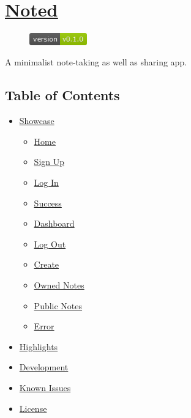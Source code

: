 \documentclass[
]{article}
\author{}
\date{}
\providecommand{\tightlist}{%
  \setlength{\itemsep}{0pt}\setlength{\parskip}{0pt}}
\begin{document}
\section{\centering \LARGE{\underline{\href{https://github.com/korigamik/noted}{Noted}}}}

\begin{figure}
  \centering
  \includegraphics[width=2.5cm]{./version-v0.1.0-green.png}
\end{figure}

A minimalist note-taking as well as sharing app.

\hypertarget{table-of-contents}{%
  \subsection{Table of Contents}\label{table-of-contents}}

\begin{itemize}
  \tightlist
  \item
        \protect\hyperlink{showcase}{Showcase}

        \begin{itemize}
          \tightlist
          \item
                \protect\hyperlink{home}{Home}
          \item
                \protect\hyperlink{sign-up}{Sign Up}
          \item
                \protect\hyperlink{log-in}{Log In}
          \item
                \protect\hyperlink{success}{Success}
          \item
                \protect\hyperlink{dashboard}{Dashboard}
          \item
                \protect\hyperlink{Logout}{Log Out}
          \item
                \protect\hyperlink{create}{Create}
          \item
                \protect\hyperlink{owned-notes}{Owned Notes}
          \item
                \protect\hyperlink{public-notes}{Public Notes}
          \item
                \protect\hyperlink{error}{Error}
        \end{itemize}
  \item
        \protect\hyperlink{highlights}{Highlights}
  \item
        \protect\hyperlink{development}{Development}
  \item
        \protect\hyperlink{known-issues}{Known Issues}
  \item
        \protect\hyperlink{license}{License}
\end{itemize}
\end{document}
